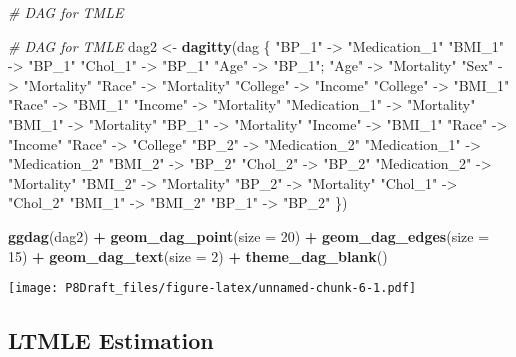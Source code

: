 \documentclass[
]{article}
\newenvironment{Shaded}{\begin{snugshade}}{\end{snugshade}}
\newcommand{\AttributeTok}[1]{\textcolor[rgb]{0.13,0.29,0.53}{#1}}
\newcommand{\CommentTok}[1]{\textcolor[rgb]{0.56,0.35,0.01}{\textit{#1}}}
\newcommand{\DecValTok}[1]{\textcolor[rgb]{0.00,0.00,0.81}{#1}}
\newcommand{\FunctionTok}[1]{\textcolor[rgb]{0.13,0.29,0.53}{\textbf{#1}}}
\newcommand{\NormalTok}[1]{#1}
\newcommand{\OtherTok}[1]{\textcolor[rgb]{0.56,0.35,0.01}{#1}}
\newcommand{\SpecialCharTok}[1]{\textcolor[rgb]{0.81,0.36,0.00}{\textbf{#1}}}
\newcommand{\StringTok}[1]{\textcolor[rgb]{0.31,0.60,0.02}{#1}}
\begin{document}
\begin{Shaded}
\begin{Highlighting}[]
\CommentTok{\# DAG for TMLE}

\CommentTok{\# DAG for TMLE}
\NormalTok{dag2 }\OtherTok{\textless{}{-}} \FunctionTok{dagitty}\NormalTok{(}\StringTok{\textquotesingle{}dag \{}
\StringTok{  "BP\_1" {-}\textgreater{} "Medication\_1"}
\StringTok{  "BMI\_1" {-}\textgreater{} "BP\_1"}
\StringTok{  "Chol\_1" {-}\textgreater{} "BP\_1"}
\StringTok{  "Age" {-}\textgreater{} "BP\_1"; "Age" {-}\textgreater{} "Mortality"}
\StringTok{  "Sex" {-}\textgreater{} "Mortality"}
\StringTok{  "Race" {-}\textgreater{} "Mortality"}
\StringTok{  "College" {-}\textgreater{} "Income"}
\StringTok{  "College" {-}\textgreater{} "BMI\_1"}
\StringTok{  "Race" {-}\textgreater{} "BMI\_1"}
\StringTok{  "Income" {-}\textgreater{} "Mortality"}
\StringTok{  "Medication\_1" {-}\textgreater{} "Mortality"}
\StringTok{  "BMI\_1" {-}\textgreater{} "Mortality"}
\StringTok{  "BP\_1" {-}\textgreater{} "Mortality"}
\StringTok{  "Income" {-}\textgreater{} "BMI\_1"}
\StringTok{  "Race" {-}\textgreater{} "Income"}
\StringTok{  "Race" {-}\textgreater{} "College"}
\StringTok{    "BP\_2" {-}\textgreater{} "Medication\_2"}
\StringTok{    "Medication\_1" {-}\textgreater{} "Medication\_2"}
\StringTok{"BMI\_2" {-}\textgreater{} "BP\_2"}
\StringTok{  "Chol\_2" {-}\textgreater{} "BP\_2"}
\StringTok{  "Medication\_2" {-}\textgreater{} "Mortality"}
\StringTok{  "BMI\_2" {-}\textgreater{} "Mortality"}
\StringTok{  "BP\_2" {-}\textgreater{} "Mortality"}
\StringTok{    "Chol\_1" {-}\textgreater{} "Chol\_2"}
\StringTok{    "BMI\_1" {-}\textgreater{} "BMI\_2"}
\StringTok{    "BP\_1" {-}\textgreater{} "BP\_2"}
\StringTok{\}\textquotesingle{}}\NormalTok{)}




\FunctionTok{ggdag}\NormalTok{(dag2) }\SpecialCharTok{+}
  \FunctionTok{geom\_dag\_point}\NormalTok{(}\AttributeTok{size =} \DecValTok{20}\NormalTok{) }\SpecialCharTok{+}  
  \FunctionTok{geom\_dag\_edges}\NormalTok{(}\AttributeTok{size =} \DecValTok{15}\NormalTok{) }\SpecialCharTok{+}
  \FunctionTok{geom\_dag\_text}\NormalTok{(}\AttributeTok{size =} \DecValTok{2}\NormalTok{) }\SpecialCharTok{+}  
  \FunctionTok{theme\_dag\_blank}\NormalTok{()}
\end{Highlighting}
\end{Shaded}

\texttt{[image: P8Draft\_files/figure-latex/unnamed-chunk-6-1.pdf]}

\hypertarget{ltmle-estimation-1}{%
\subsection{LTMLE Estimation}\label{ltmle-estimation-1}}
\end{document}
